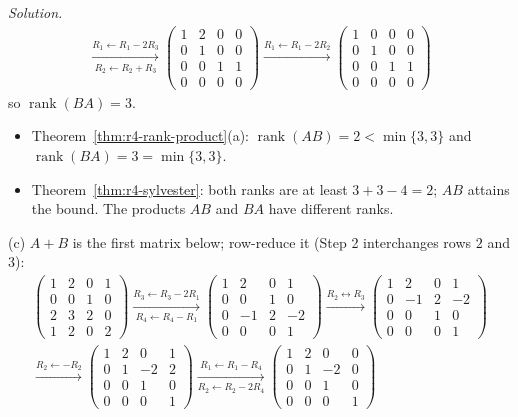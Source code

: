 \documentclass[12pt]{article}
\DeclareMathOperator{\rank}{rank}
\theoremstyle{definition}
\newenvironment{solution}{\par\noindent\textit{Solution.}\ }{\par\smallskip}
\begin{document}
\begin{solution}
\[\begin{gathered}
\xrightarrow[R_2\leftarrow R_2+R_3]{R_1\leftarrow R_1-2R_3}
\begin{pmatrix}1&2&0&0\\0&1&0&0\\0&0&1&1\\0&0&0&0\end{pmatrix}
\xrightarrow{R_1\leftarrow R_1-2R_2}
\begin{pmatrix}1&0&0&0\\0&1&0&0\\0&0&1&1\\0&0&0&0\end{pmatrix}
\end{gathered}
\]
so \(\rank(BA)=3\).
\begin{itemize}
\item Theorem~\ref{thm:r4-rank-product}(a): \(\rank(AB)=2<\min\{3,3\}\) and \(\rank(BA)=3=\min\{3,3\}\).
\item Theorem~\ref{thm:r4-sylvester}: both ranks are at least \(3+3-4=2\); \(AB\) attains the bound. The products
\(AB\) and \(BA\) have different ranks.
\end{itemize}
(c) \(A+B\) is the first matrix below; row-reduce it (Step 2 interchanges rows \(2\) and \(3\)):
\[
\begin{gathered}
\begin{pmatrix}1&2&0&1\\0&0&1&0\\2&3&2&0\\1&2&0&2\end{pmatrix}
\xrightarrow[R_4\leftarrow R_4-R_1]{R_3\leftarrow R_3-2R_1}
\begin{pmatrix}1&2&0&1\\0&0&1&0\\0&-1&2&-2\\0&0&0&1\end{pmatrix}
\xrightarrow{R_2\leftrightarrow R_3}
\begin{pmatrix}1&2&0&1\\0&-1&2&-2\\0&0&1&0\\0&0&0&1\end{pmatrix}
\\
\xrightarrow{R_2\leftarrow-R_2}
\begin{pmatrix}1&2&0&1\\0&1&-2&2\\0&0&1&0\\0&0&0&1\end{pmatrix}
\xrightarrow[R_2\leftarrow R_2-2R_4]{R_1\leftarrow R_1-R_4}
\begin{pmatrix}1&2&0&0\\0&1&-2&0\\0&0&1&0\\0&0&0&1\end{pmatrix}

\end{gathered}\]
\end{solution}
\end{document}
